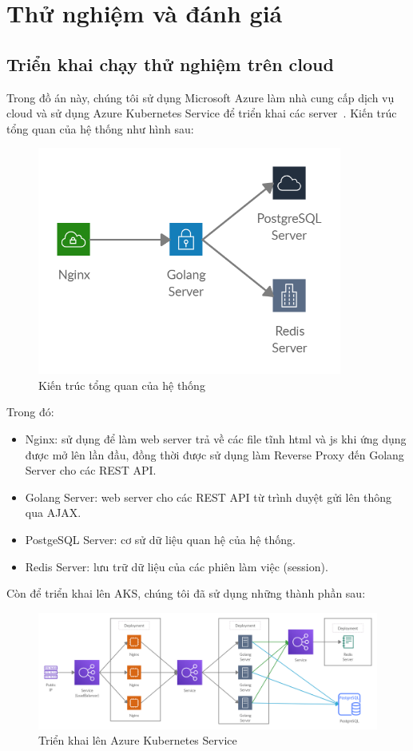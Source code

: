\chapter{Thử nghiệm và đánh giá}
\section{Triển khai chạy thử nghiệm trên cloud}
Trong đồ án này, chúng tôi sử dụng Microsoft Azure làm nhà cung cấp dịch vụ
cloud và sử dụng Azure Kubernetes Service
để triển khai các server~\cite{kubeazure}.
Kiến trúc tổng quan của hệ thống như hình sau:
\begin{figure}[H]
\centering
\includegraphics[width=10cm]{images/architecture.png}
\caption{Kiến trúc tổng quan của hệ thống}
\end{figure}
Trong đó:
\begin{itemize}[topsep=0ex]
\item Nginx: sử dụng để làm web server trả về các file tĩnh html và js khi
ứng dụng được mở lên lần đầu, đồng thời được sử dụng làm Reverse Proxy đến
Golang Server cho các REST API.

\item Golang Server: web server cho các REST API từ trình duyệt gửi lên
thông qua AJAX.

\item PostgeSQL Server: cơ sử dữ liệu quan hệ của hệ thống.

\item Redis Server: lưu trữ dữ liệu của các phiên làm việc (session).
\end{itemize}

Còn để triển khai lên AKS, chúng tôi đã sử dụng những thành phần sau:
\begin{figure}[H]
\centering
\includegraphics[width=\textwidth]{images/deploy.png}
\caption{Triển khai lên Azure Kubernetes Service}
\end{figure}

